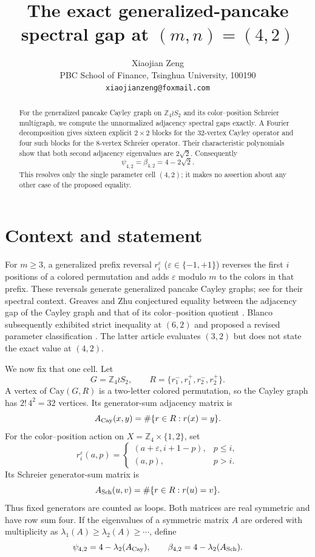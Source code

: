 \documentclass[11pt]{article}
\title{The exact generalized-pancake spectral gap at $(m,n)=(4,2)$}
\author{Xiaojian Zeng\\
PBC School of Finance, Tsinghua University, 100190\\
\texttt{xiaojianzeng@foxmail.com}}
\date{}
\newcommand{\Z}{\mathbb Z}
\newcommand{\Cay}{\mathrm{Cay}}
\begin{document}
\maketitle

\begin{abstract}
For the generalized pancake Cayley graph on
$\Z_4\wr S_2$ and its color--position Schreier multigraph, we compute the
unnormalized adjacency spectral gaps exactly.  A Fourier decomposition gives
sixteen explicit $2\times2$ blocks for the $32$-vertex Cayley operator and
four such blocks for the $8$-vertex Schreier operator.  Their characteristic
polynomials show that both second adjacency eigenvalues are $2\sqrt2$.
Consequently
\[
  \psi_{4,2}=\beta_{4,2}=4-2\sqrt2.
\]
This resolves only the single parameter cell $(4,2)$; it makes no assertion
about any other case of the proposed equality.
\end{abstract}

\section{Context and statement}

For $m\geq 3$, a generalized prefix reversal $r_i^\varepsilon$
($\varepsilon\in\{-1,+1\}$) reverses the first $i$ positions of a colored
permutation and adds $\varepsilon$ modulo $m$ to the colors in that prefix.
These reversals generate generalized pancake Cayley graphs; see
\cite{BlancoBuehrle2025,GreavesZhu2026,Blanco2026} for their spectral
context.  Greaves and Zhu conjectured equality between the adjacency gap of
the Cayley graph and that of its color--position quotient
\cite[Conjecture~2]{GreavesZhu2026}.  Blanco subsequently exhibited strict
inequality at $(6,2)$ and proposed a revised parameter classification
\cite[Section~5]{Blanco2026}.  The latter article evaluates $(3,2)$ but does
not state the exact value at $(4,2)$.

We now fix that one cell.  Let
\[
 G=\Z_4\wr S_2,\qquad
 R=\{r_1^-,r_1^+,r_2^-,r_2^+\}.
\]
A vertex of $\Cay(G,R)$ is a two-letter colored permutation, so the Cayley
graph has $2!\,4^2=32$ vertices.  Its generator-sum adjacency matrix is
\[
 A_{\rm Cay}(x,y)=\#\{r\in R:r(x)=y\}.
\]
For the color--position action on $X=\Z_4\times\{1,2\}$, set
\[
 r_i^\varepsilon(a,p)=
 \begin{cases}
   (a+\varepsilon,i+1-p),&p\leq i,\\
   (a,p),&p>i.
 \end{cases}
\]
Its Schreier generator-sum matrix is
\[
 A_{\rm Sch}(u,v)=\#\{r\in R:r(u)=v\}.
\]
Thus fixed generators are counted as loops.  Both matrices are real
symmetric and have row sum four.  If the eigenvalues of a symmetric matrix
$A$ are ordered with multiplicity as
$\lambda_1(A)\geq\lambda_2(A)\geq\cdots$, define
\[
 \psi_{4,2}=4-\lambda_2(A_{\rm Cay}),\qquad
 \beta_{4,2}=4-\lambda_2(A_{\rm Sch}).
\]
\end{document}
